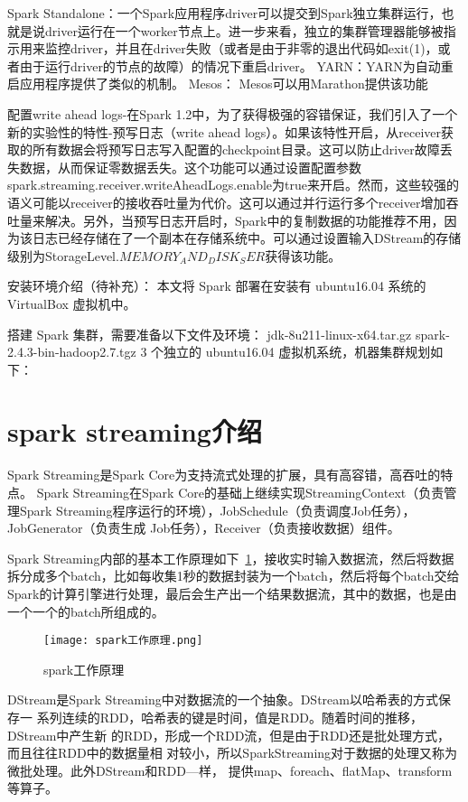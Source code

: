   Spark Standalone：一个Spark应用程序driver可以提交到Spark独立集群运行，也就是说driver运行在一个worker节点上。进一步来看，独立的集群管理器能够被指示用来监控driver，并且在driver失败（或者是由于非零的退出代码如exit(1)，或者由于运行driver的节点的故障）的情况下重启driver。
  YARN：YARN为自动重启应用程序提供了类似的机制。
  Mesos： Mesos可以用Marathon提供该功能
  
  配置write ahead logs-在Spark 1.2中，为了获得极强的容错保证，我们引入了一个新的实验性的特性-预写日志（write ahead logs）。如果该特性开启，从receiver获取的所有数据会将预写日志写入配置的checkpoint目录。这可以防止driver故障丢失数据，从而保证零数据丢失。这个功能可以通过设置配置参数spark.streaming.receiver.writeAheadLogs.enable为true来开启。然而，这些较强的语义可能以receiver的接收吞吐量为代价。这可以通过并行运行多个receiver增加吞吐量来解决。另外，当预写日志开启时，Spark中的复制数据的功能推荐不用，因为该日志已经存储在了一个副本在存储系统中。可以通过设置输入DStream的存储级别为StorageLevel.$MEMORY_AND_DISK_SER$获得该功能。

安装环境介绍（待补充）：
本文将 Spark 部署在安装有 ubuntu16.04 系统的 VirtualBox 虚拟机中。

搭建 Spark 集群，需要准备以下文件及环境：
jdk-8u211-linux-x64.tar.gz
spark-2.4.3-bin-hadoop2.7.tgz
3 个独立的 ubuntu16.04 虚拟机系统，机器集群规划如下：

\section{spark streaming介绍}
Spark Streaming是Spark Core为支持流式处理的扩展，具有高容错，高吞吐的特点。
Spark Streaming在Spark Core的基础上继续实现StreamingContext（负责管理Spark Streaming程序运行的环境），JobSchedule（负责调度Job任务），JobGenerator（负责生成
Job任务），Receiver（负责接收数据）组件。

Spark Streaming内部的基本工作原理如下~\ref{fig:spark工作原理}，接收实时输入数据流，然后将数据拆分成多个batch，比如每收集1秒的数据封装为一个batch，然后将每个batch交给Spark的计算引擎进行处理，最后会生产出一个结果数据流，其中的数据，也是由一个一个的batch所组成的。

\begin{figure}
    \centering
    \texttt{[image: spark工作原理.png]}
    \caption{spark工作原理}
    \label{fig:spark工作原理}
  \end{figure}

DStream是Spark Streaming中对数据流的一个抽象。DStream以哈希表的方式保存一
系列连续的RDD，哈希表的键是时间，值是RDD。随着时间的推移，DStream中产生新
的RDD，形成一个RDD流，但是由于RDD还是批处理方式，而且往往RDD中的数据量相
对较小，所以SparkStreaming对于数据的处理又称为微批处理。此外DStream和RDD—样，
提供map、foreach、flatMap、transform等算子。

